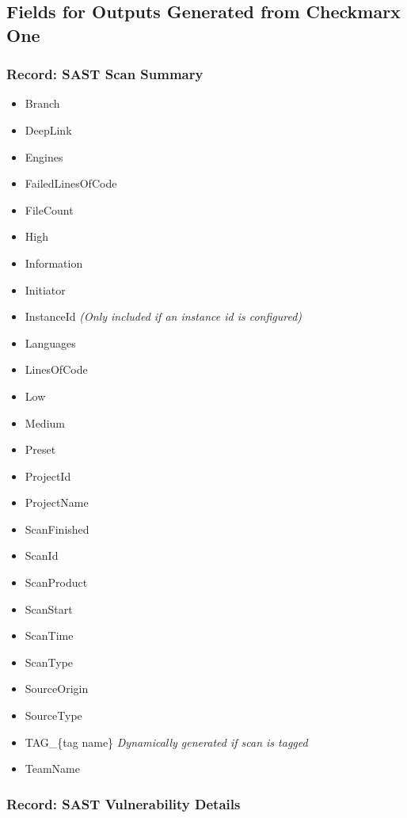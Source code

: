 \subsection{Fields for Outputs Generated from Checkmarx One}


\subsubsection{Record: SAST Scan Summary}

\begin{itemize}
    \item Branch
    \item DeepLink
    \item Engines
    \item FailedLinesOfCode
    \item FileCount
    \item High
    \item Information
    \item Initiator
    \item InstanceId \textit{(Only included if an instance id is configured)}
    \item Languages
    \item LinesOfCode
    \item Low
    \item Medium
    \item Preset
    \item ProjectId
    \item ProjectName
    \item ScanFinished
    \item ScanId
    \item ScanProduct
    \item ScanStart
    \item ScanTime
    \item ScanType
    \item SourceOrigin
    \item SourceType
    \item TAG\_\{tag name\} \textit{Dynamically generated if scan is tagged}
    \item TeamName
\end{itemize}


\subsubsection{Record: SAST Vulnerability Details}

